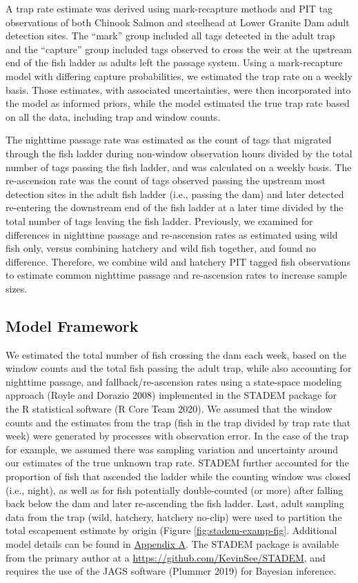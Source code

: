 \documentclass[
  12pt,
]{article}
\begin{document}
A trap rate estimate was derived using mark-recapture methods and PIT tag observations of both Chinook Salmon and steelhead at Lower Granite Dam adult detection sites. The ``mark'' group included all tags detected in the adult trap and the ``capture'' group included tags observed to cross the weir at the upstream end of the fish ladder as adults left the passage system. Using a mark-recapture model with differing capture probabilities, we estimated the trap rate on a weekly basis. Those estimates, with associated uncertainties, were then incorporated into the model as informed priors, while the model estimated the true trap rate based on all the data, including trap and window counts.

The nighttime passage rate was estimated as the count of tags that migrated through the fish ladder during non-window observation hours divided by the total number of tags passing the fish ladder, and was calculated on a weekly basis. The re-ascension rate was the count of tags observed passing the upstream most detection sites in the adult fish ladder (i.e., passing the dam) and later detected re-entering the downstream end of the fish ladder at a later time divided by the total number of tags leaving the fish ladder. Previously, we examined for differences in nighttime passage and re-ascension rates as estimated using wild fish only, versus combining hatchery and wild fish together, and found no difference. Therefore, we combine wild and hatchery PIT tagged fish observations to estimate common nighttime passage and re-ascension rates to increase sample sizes.

\hypertarget{model-framework}{%
\subsection{Model Framework}\label{model-framework}}

We estimated the total number of fish crossing the dam each week, based on the window counts and the total fish passing the adult trap, while also accounting for nighttime passage, and fallback/re-ascension rates using a state-space modeling approach (Royle and Dorazio 2008) implemented in the STADEM package for the R statistical software (R Core Team 2020). We assumed that the window counts and the estimates from the trap (fish in the trap divided by trap rate that week) were generated by processes with observation error. In the case of the trap for example, we assumed there was sampling variation and uncertainty around our estimates of the true unknown trap rate. STADEM further accounted for the proportion of fish that ascended the ladder while the counting window was closed (i.e., night), as well as for fish potentially double-counted (or more) after falling back below the dam and later re-ascending the fish ladder. Last, adult sampling data from the trap (wild, hatchery, hatchery no-clip) were used to partition the total escapement estimate by origin (Figure \ref{fig:stadem-examp-fig}. Additional model details can be found in \protect\hyperlink{append1}{Appendix A}. The STADEM package is available from the primary author at a \url{https://github.com/KevinSee/STADEM}, and requires the use of the JAGS software (Plummer 2019) for Bayesian inference.
\end{document}
